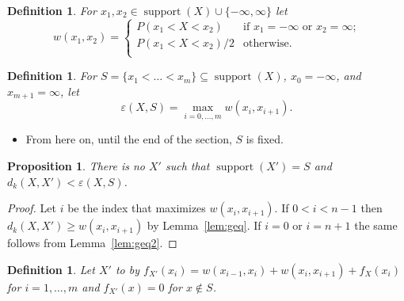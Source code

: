 \documentclass{article}
\newtheorem{definition}[thm]{Definition}
\newtheorem{proposition}[thm]{Proposition}
\DeclareMathOperator{\support}{support}
\begin{document}
\begin{definition}\label{def:weight} For $x_1,x_2 \in \support(X) \cup \{-\infty,\infty\}$ let
	\[
	w(x_1,x_2)=
	\begin{cases}
		P(x_1 < X < x_2) & \text{if $x_1=-\infty$ or $x_2 = \infty$;} \\
		P(x_1 < X < x_2)/2 & \text{otherwise.} \\	
	\end{cases}
	\]
\end{definition} 


\begin{definition}\label{def:error} For $S=\{x_1<\dots<x_m\} \subseteq \support(X)$, $x_0=-\infty$, and $x_{m+1}=\infty$, let
	\[
	\varepsilon(X,S) = \max\limits_{i=0,\dots,m} w(x_{i}, x_{i+1}).
	\]
\end{definition} 

\begin{itemize}
	\item From here on, until the end of the section, $S$ is fixed.
\end{itemize}



\begin{proposition}
	There is no $X'$ such that $\support(X')=S$ and $d_k(X,X') < \varepsilon(X,S)$.
\end{proposition}
\begin{proof}
	Let $i$ be the index that maximizes $w(x_{i}, x_{i+1})$. If $0<i<n-1$ then $d_k(X,X') \geq w(x_{i}, x_{i+1})$ by Lemma~\ref{lem:geq}. If $i=0$ or $i=n+1$ the same follows from Lemma~\ref{lem:geq2}.
\end{proof}

\begin{definition}\label{def:construction}
Let $X'$ to by $f_{X'}(x_{i}) = w(x_{i-1},x_i) + w(x_i,x_{i+1}) + f_{X}(x_i)$ for $i=1,\dots,m$ and $f_{X'}(x)=0$ for $x \notin S$.
\end{definition}
\end{document}
